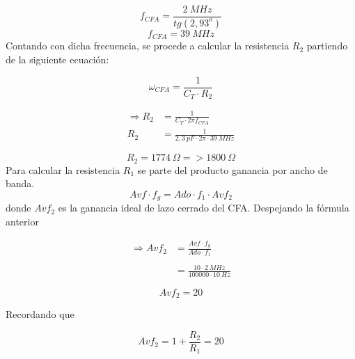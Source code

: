 \documentclass[a4paper,12pt]{article}
\begin{document}
\begin{equation}
    f_{CFA} = \frac{2~MHz}{tg (2,93^o)}
\end{equation}
\begin{equation}
     \boxed{
        f_{CFA} = 39~MHz
    }
\end{equation}
\vspace{0,2cm}
\hspace{1mm}Contando con dicha frecuencia, se procede a calcular la resistencia $ R_2 $ partiendo de la siguiente ecuación:

\begin{equation}
    \omega _{CFA} = \frac{1}{C_T \cdot R_2}
\end{equation}


\begin{align}
   \Longrightarrow R_2 &= \frac{1}{C_T \cdot 2\pi f_{CFA}}
    \\
    R_2 &= \frac{1}{2,3~pF \cdot 2\pi \cdot 39~MHz}
\end{align}

\begin{equation}
    \boxed{
        R_2 = 1774~\Omega=> 1800~\Omega
    }
\end{equation}
\vspace{0,2cm}
\hspace{1mm}Para calcular la resistencia $ R_1 $ se parte del producto ganancia por ancho de banda.
\begin{equation}
    Avf \cdot f_g = Ado \cdot f_1 \cdot Avf_2
\end{equation}
\vspace{0.2cm}
\hspace{1mm}donde $ Avf_2 $ es la ganancia ideal de lazo cerrado del CFA. Despejando la fórmula anterior

\begin{align}
   \Longrightarrow Avf_2 &= \frac{Avf \cdot f_g}{Ado \cdot f_1} \label{eq:primera} \\
   \nonumber
   \\
         &= \frac{10 \cdot 2~MHz}{100000 \cdot 10~Hz}
\end{align}

\begin{equation}
    \boxed{
    Avf_2 = 20
    }
\end{equation}

\vspace{0,2cm}
\hspace{1mm}Recordando que 

\begin{equation}
    Avf_2 = 1 + \frac{R_2}{R_1} = 20
\end{equation}
\end{document}
